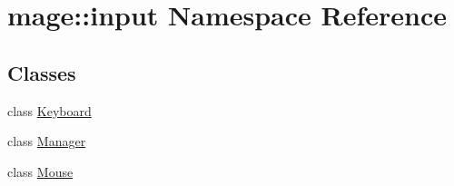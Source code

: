 \hypertarget{namespacemage_1_1input}{}\section{mage\+:\+:input Namespace Reference}
\label{namespacemage_1_1input}
\subsection*{Classes}
\begin{DoxyCompactItemize}
\item 
class \hyperlink{classmage_1_1input_1_1_keyboard}{Keyboard}
\item 
class \hyperlink{classmage_1_1input_1_1_manager}{Manager}
\item 
class \hyperlink{classmage_1_1input_1_1_mouse}{Mouse}
\end{DoxyCompactItemize}
